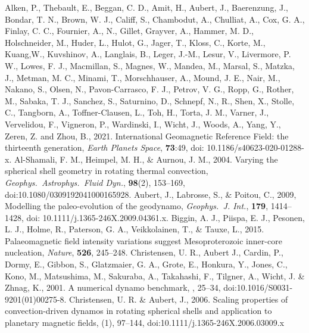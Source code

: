 \begin{thebibliography}{}
%
{\color{red}
Alken, P., Thebault, E., Beggan, C. D., Amit, H., Aubert, J., Baerenzung, J., Bondar, T. N., Brown, W. J., Califf, S., Chambodut, A., Chulliat, A., Cox, G. A., Finlay, C. C., Fournier, A., N., Gillet, Grayver, A., Hammer, M. D., Holschneider, M., Huder, L., Hulot, G., Jager, T., Kloss, C., Korte, M., Kuang,W., Kuvshinov, A., Langlais, B., Leger, J.-M., Lesur, V., Livermore, P. W., Lowes, F. J., Macmillan, S., Magnes, W., Mandea, M., Marsal, S., Matzka, J., Metman, M. C., Minami, T., Morschhauser, A., Mound, J. E., Nair, M., Nakano, S., Olsen, N., Pavon-Carrasco, F. J., Petrov, V. G., Ropp, G., Rother, M., Sabaka, T. J., Sanchez, S., Saturnino, D., Schnepf, N., R., Shen, X., Stolle, C., Tangborn, A., Toffner-Clausen, L., Toh, H., Torta, J. M., Varner, J., Vervelidou, F., Vigneron, P., Wardinski, I., Wicht, J., Woods, A., Yang, Y., Zeren, Z. and Zhou, B., 2021. International Geomagnetic Reference Field: the thirteenth generation, {\it Earth Planets Space}, {\bf 73}:49, doi: 10.1186/s40623-020-01288-x.
}
%
Al-Shamali, F. M., Heimpel, M. H., \& Aurnou, J. M., 2004. Varying the spherical shell geometry in rotating thermal convection, {\it Geophys.\  Astrophys.\ Fluid Dyn.}, {\bf 98}(2), 153--169, doi:10.1080/0309192041000165928.
%
Aubert, J., Labrosse, S., \& Poitou, C., 2009, Modelling the paleo-evolution of the geodynamo, {\it Geophys.\ J. Int.}, {\bf 179}, 1414--1428, doi: 10.1111/j.1365-246X.2009.04361.x.
%
Biggin, A. J., Piispa, E. J., Pesonen, L. J., Holme, R., Paterson, G. A., Veikkolainen, T., \& Tauxe, L., 2015. Palaeomagnetic field intensity variations suggest Mesoproterozoic inner-core nucleation, {\it Nature}, {\bf 526}, 245–248.
%
Christensen, U. R., Aubert J., Cardin, P., Dormy, E., Gibbon, S., Glatzmaier, G. A., Grote, E., Honkura, Y., Jones, C., Kono, M., Matsushima, M., Sakuraba, A., Takahashi, F., Tilgner, A., Wicht, J. \& Zhnag, K., 2001. A numerical dynamo benchmark, , 25--34, doi:10.1016/S0031-9201(01)00275-8.
%
Christensen, U. R. \& Aubert, J., 2006. Scaling properties of convection-driven dynamos in rotating spherical shells and application to planetary magnetic fields, (1), 97--144, doi:10.1111/j.1365-246X.2006.03009.x

\end{thebibliography}
